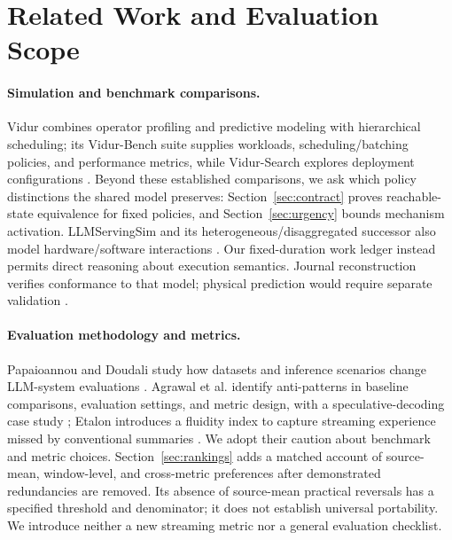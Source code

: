\section{Related Work and Evaluation Scope}
\paragraph{Simulation and benchmark comparisons.}
Vidur combines operator profiling and predictive modeling with hierarchical
scheduling; its Vidur-Bench suite supplies workloads, scheduling/batching
policies, and performance metrics, while Vidur-Search explores deployment
configurations \citep[Sections~4--6]{vidur2024}. Beyond these established comparisons, we ask which policy distinctions
the shared model preserves: Section~\ref{sec:contract} proves reachable-state
equivalence for fixed policies, and Section~\ref{sec:urgency} bounds mechanism activation.
LLMServingSim and its heterogeneous/disaggregated successor also model
hardware/software interactions \citep{llmservingsim2024,llmservingsim2026}.
Our fixed-duration work ledger instead permits direct reasoning about
execution semantics. Journal reconstruction verifies conformance to that
model; physical prediction would require separate validation \citep{sargent2013}.

\paragraph{Evaluation methodology and metrics.}
Papaioannou and Doudali study how datasets and inference scenarios change
LLM-system evaluations \citep{papaioannou2024workload}. Agrawal et al. identify
anti-patterns in baseline comparisons, evaluation settings, and metric
design, with a speculative-decoding case study
\citep[Sections~3--4]{agrawal2025evaluation}; Etalon introduces a fluidity index to
capture streaming experience missed by conventional summaries
\citep[Sections~3--5]{agrawal2024etalon}. We adopt their caution about
benchmark and metric choices. Section~\ref{sec:rankings} adds a matched
account of source-mean, window-level, and cross-metric preferences after
demonstrated redundancies are removed. Its absence of source-mean practical
reversals has a specified threshold and denominator; it does not establish
universal portability. We introduce neither a new streaming metric nor a
general evaluation checklist.

